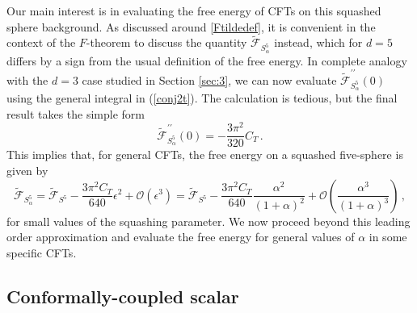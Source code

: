 \documentclass[12pt]{article}
\numberwithin{equation}{section}
\newcommand{\req}[1]{(\ref{#1})} %
\newcommand{\labell}[1]{\label{#1}}
\newcommand{\ssc}{\scriptscriptstyle}
\newcommand{\ctt}{C_{\ssc T}}
\begin{document}
%
Our main interest is in evaluating the free energy of CFTs on this squashed sphere background. As discussed around \eqref{Ftildedef}, it is convenient in the context of the $F$-theorem to discuss the quantity $\tilde{\mathcal{F}}_{S^{5}_{\alpha}}$ instead, which for $d=5$ differs by a sign from the usual definition of the free energy. In complete analogy with the $d=3$ case studied in Section \ref{sec:3}, we can now evaluate $\tilde{\mathcal{F}}^{\prime\prime}_{S^{5}_{\alpha}}(0)$ using the general integral in \req{conj2t}. The calculation is tedious, but the final result takes the simple form
%
\begin{equation}\labell{f455}
\tilde{\mathcal{F}}^{\prime\prime}_{S^{5}_{\alpha}}(0)= - \frac{3\pi^2}{320}\ctt\, .
\end{equation}
%
This implies that, for general CFTs, the free energy on a squashed five-sphere is given by 
%
\begin{equation}\labell{f485}
\tilde{\mathcal{F}}_{S^{5}_{\alpha}}=\tilde{\mathcal{F}}_{S^{5}}-\frac{3\pi^2\ctt}{640}\epsilon^2+\mathcal{O}\left(\epsilon^3\right)=\tilde{\mathcal{F}}_{S^{5}}-\frac{3\pi^2\ctt}{640}\frac{\alpha^2}{(1+\alpha)^2}+\mathcal{O}\left(\frac{\alpha^3}{(1+\alpha)^3}\right)\, ,
\end{equation}
%
for small values of the squashing parameter. We now proceed beyond this leading order approximation and evaluate the free energy for general values of $\alpha$ in some specific CFTs.

\subsection{Conformally-coupled scalar}
\label{freee}
\end{document}
